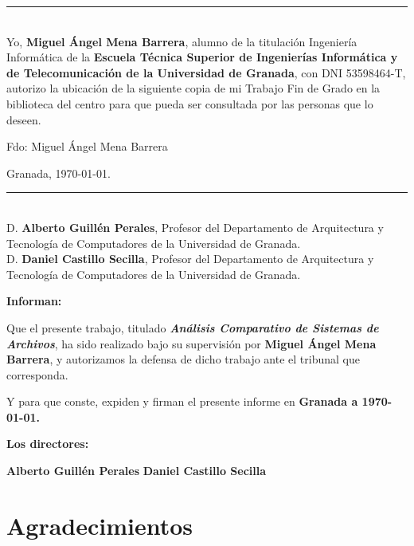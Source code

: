 \raggedbottom
\thispagestyle{empty}
\cleardoublepage
\thispagestyle{empty}
\vspace{3cm}

\noindent\rule[-1ex]{\textwidth}{2pt}\\[4.5ex]

Yo, \textbf{Miguel Ángel Mena Barrera}, alumno de la titulación Ingeniería Informática de la \textbf{Escuela Técnica Superior de Ingenierías Informática y de Telecomunicación de la Universidad de Granada}, con DNI 53598464-T, autorizo la ubicación de la siguiente copia de mi Trabajo Fin de Grado en la biblioteca del centro para que pueda ser consultada por las personas que lo deseen.

\vspace{6cm}

\noindent Fdo: Miguel Ángel Mena Barrera

\vspace{2cm}

\begin{flushright}
Granada, \today.
\end{flushright}



\thispagestyle{empty}
\cleardoublepage
\thispagestyle{empty}

\noindent\rule[-1ex]{\textwidth}{2pt}\\[4.5ex]

D. \textbf{Alberto Guillén Perales}, Profesor del Departamento de Arquitectura y Tecnología de Computadores de la Universidad de Granada.\\

D. \textbf{Daniel Castillo Secilla}, Profesor del Departamento de Arquitectura y Tecnología de Computadores de la Universidad de Granada.


\vspace{0.5cm}

\textbf{Informan:}

\vspace{0.5cm}

Que el presente trabajo, titulado \textit{\textbf{Análisis Comparativo de Sistemas de Archivos}}, ha sido realizado bajo su supervisión por \textbf{Miguel Ángel Mena Barrera}, y autorizamos la defensa de dicho trabajo ante el tribunal que corresponda.

\vspace{0.5cm}

Y para que conste, expiden y firman el presente informe en \textbf{Granada a \today.}

\vspace{1cm}

\textbf{Los directores:}

\vspace{5cm}

\noindent \textbf{Alberto Guillén Perales} \hspace{5cm} \textbf{Daniel Castillo Secilla} 

\chapter*{Agradecimientos}
\thispagestyle{empty}

\vspace{1cm}


